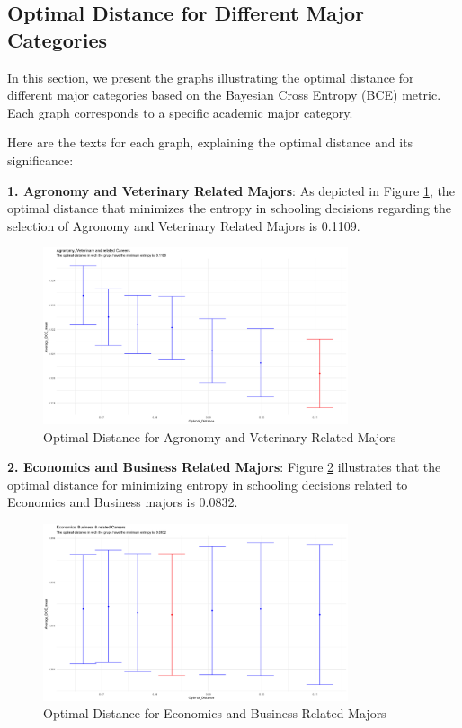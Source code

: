 \subsection{Optimal Distance for Different Major Categories}

In this section, we present the graphs illustrating the optimal distance for different major categories based on the Bayesian Cross Entropy (BCE) metric. Each graph corresponds to a specific academic major category.

Here are the texts for each graph, explaining the optimal distance and its significance:

\textbf{1. Agronomy and Veterinary Related Majors}:
   As depicted in Figure \ref{fig:optimal_distance_agronomy_vet}, the optimal distance that minimizes the entropy in schooling decisions regarding the selection of Agronomy and Veterinary Related Majors is 0.1109.

\begin{figure}[H]
    \centering
    \includegraphics[width=0.8\textwidth]{Graph/Results/optimal_distance_bs30_AGRONOMY_VETERINARY_RELATED.png}
    \caption{Optimal Distance for Agronomy and Veterinary Related Majors}
    \label{fig:optimal_distance_agronomy_vet}
\end{figure}

\textbf{2. Economics and Business Related Majors}:
   Figure \ref{fig:optimal_distance_econ_bus} illustrates that the optimal distance for minimizing entropy in schooling decisions related to Economics and Business majors is 0.0832.

\begin{figure}[H]
    \centering
    \includegraphics[width=0.8\textwidth]{Graph/Results/optimal_distance_bs30_ECONOMICS_BUSINESS_RELATED.png}
    \caption{Optimal Distance for Economics and Business Related Majors}
    \label{fig:optimal_distance_econ_bus}
\end{figure}

